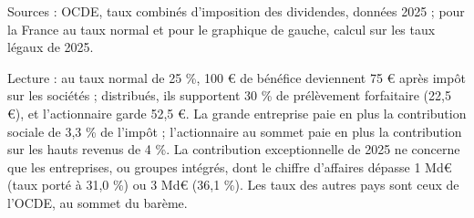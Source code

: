 Sources : OCDE, taux combinés d'imposition des dividendes, données 2025 ; pour la France au taux normal et pour le graphique de gauche, calcul sur les taux légaux de 2025.\par Lecture : au taux normal de 25 \%, 100 \euro{} de bénéfice deviennent 75 \euro{} après impôt sur les sociétés ; distribués, ils supportent 30 \% de prélèvement forfaitaire (22,5 \euro{}), et l'actionnaire garde 52,5 \euro{}. La grande entreprise paie en plus la contribution sociale de 3,3 \% de l'impôt ; l'actionnaire au sommet paie en plus la contribution sur les hauts revenus de 4 \%. La contribution exceptionnelle de 2025 ne concerne que les entreprises, ou groupes intégrés, dont le chiffre d'affaires dépasse 1 Md\euro{} (taux porté à 31,0 \%) ou 3 Md\euro{} (36,1 \%). Les taux des autres pays sont ceux de l'OCDE, au sommet du barème.
